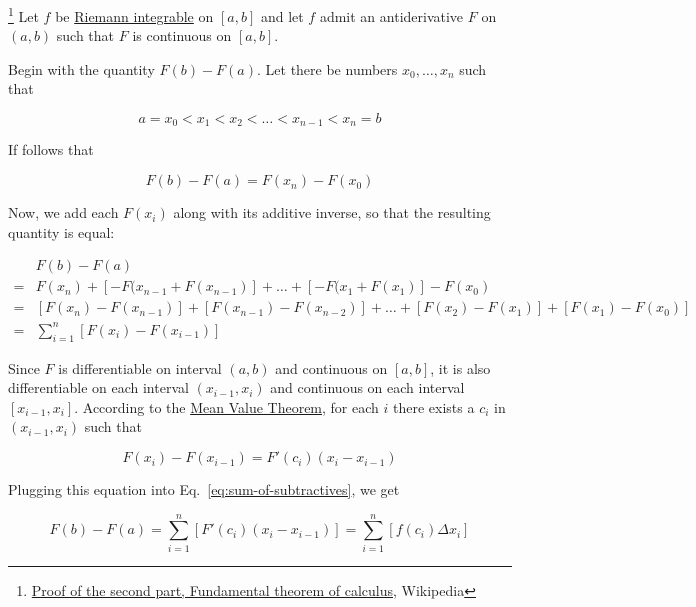 \footnote{\href{https://en.wikipedia.org/wiki/Fundamental\_theorem\_of\_calculus\#Proof\_of\_the\_second\_part}{Proof of the second part, Fundamental theorem of calculus}, Wikipedia}
Let $f$ be \hyperref[eq:riemann-integral]{Riemann integrable} on $[a, b]$ and let $f$ admit an antiderivative $F$ on
$(a, b)$ such that $F$ is continuous on $[a, b]$.

Begin with the quantity $F(b) - F(a)$. Let there be numbers $x_0, \ldots, x_n$ such that

\begin{equation}
    a = x_0 < x_1 < x_2 < \ldots < x_{n - 1} < x_n = b
\end{equation}

If follows that

\begin{equation}
    F(b) - F(a) = F(x_n) - F(x_0)
\end{equation}

Now, we add each $F(x_i)$ along with its additive inverse, so that the resulting quantity is equal:

\begin{align}
    &F(b) - F(a) \\
    ={}& F(x_n) + [-F(x_{n - 1} + F(x_{n - 1})] + \ldots + [-F(x_{1} + F(x_{1})] - F(x_0) \\
    ={}& [F(x_n) - F(x_{n - 1})] + [F(x_{n - 1}) - F(x_{n - 2})] + \ldots + [F(x_2) - F(x_1)] + [F(x_{1}) - F(x_0)] \\
    ={}& \sum_{i = 1}^n \left[ F(x_i) - F(x_{i - 1}) \right] \label{eq:sum-of-subtractives}
\end{align}

Since $F$ is differentiable on interval $(a, b)$ and continuous on $[a, b]$, it is also differentiable on each interval
$(x_{i - 1}, x_i)$ and continuous on each interval $[x_{i - 1}, x_i]$. According to the
\hyperlink{theo:mean-value-theorem}{Mean Value Theorem}, for each $i$ there exists a $c_i$ in $(x_{i - 1}, x_i)$ such
that

\begin{equation}
    F(x_i) - F(x_{i - 1}) = F'(c_i)(x_i - x_{i - 1})
\end{equation}

Plugging this equation into Eq.~\ref{eq:sum-of-subtractives}, we get

\begin{equation}
    F(b) - F(a) = \sum_{i = 1}^n \left[ F'(c_i)(x_i - x_{i - 1}) \right] = \sum_{i = 1}^n \left[ f(c_i)\Delta x_i \right]
\end{equation}


